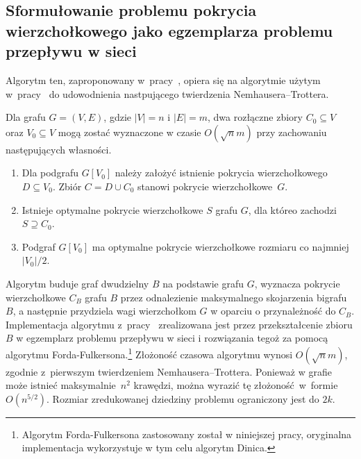 \subsection{Sformułowanie problemu pokrycia wierzchołkowego jako egzemplarza problemu przepływu w sieci}\label{Kernelization_network_flow}
Algorytm ten, zaproponowany w~pracy~\cite{KernelizationAlgorithms04}, opiera się na
algorytmie użytym w~pracy~\cite{Niedermeier02} do udowodnienia nastpującego twierdzenia
Nemhausera--Trottera.

\begin{theorem}
  Dla grafu $G=(V,E)$, gdzie $|V|=n$ i $|E|=m$, dwa rozłączne zbiory $C_0 \subseteq V$ oraz $V_0 \subseteq V$ mogą zostać wyznaczone w czasie $O(\sqrt{n}m)$ przy zachowaniu następujących własności.
  \begin{enumerate}
    \item Dla podgrafu $G[V_0]$ należy założyć istnienie pokrycia wierzchołkowego $D \subseteq V_0$.
    Zbiór $C = D \cup C_0$ stanowi pokrycie wierzchołkowe~$G$.
    \item Istnieje optymalne pokrycie wierzchołkowe $S$ grafu $G$, dla któreo zachodzi $S \supseteq C_0$.
    \item Podgraf $G[V_0]$ ma optymalne pokrycie wierzchołkowe rozmiaru co najmniej $|V_0|/2$. 
  \end{enumerate}
\end{theorem}

Algorytm buduje graf dwudzielny $B$ na podstawie grafu $G$, wyznacza pokrycie wierzchołkowe $C_B$ grafu $B$ przez odnalezienie maksymalnego skojarzenia bigrafu $B$,
a następnie przydziela wagi wierzchołkom $G$ w oparciu o przynależność do $C_B$.
Implementacja algorytmu z~pracy~\cite{Niedermeier02} zrealizowana jest przez
przekształcenie zbioru $B$ w egzemplarz problemu przepływu w sieci i rozwiązania tegoż za pomocą algorytmu Forda-Fulkersona.\footnote{Algorytm Forda-Fulkersona
  zastosowany został w niniejszej pracy, oryginalna implementacja wykorzystuje w tym celu algorytm Dinica.}
Złożoność czasowa algorytmu wynosi $O(\sqrt{n}m)$, zgodnie z~pierwszym twierdzeniem Nemhausera--Trottera. 
Ponieważ w grafie może istnieć maksymalnie~$n^2$ krawędzi, można wyrazić tę złożoność~w~formie $O(n^{5/2})$.
Rozmiar zredukowanej dziedziny problemu ograniczony jest do $2k$.

